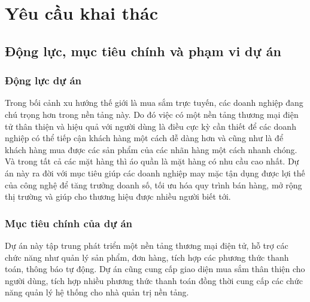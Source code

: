 \section{Yêu cầu khai thác}
    \subsection{Động lực, mục tiêu chính và phạm vi dự án}
        \subsubsection{Động lực dự án}
            Trong bối cảnh xu hướng thế giới là mua sắm trực tuyến, các doanh nghiệp đang chú trọng hơn trong nền tảng này. Do đó việc có một nền tảng thương mại điện tử thân thiện và hiệu quả với người dùng là điều cực kỳ cần thiết để các doanh nghiệp có thể tiếp cận khách hàng một cách dễ dàng hơn và cũng như là để khách hàng mua được các sản phẩm của các nhãn hàng một cách nhanh chóng. Và trong tất cả các mặt hàng thì áo quần là mặt hàng có nhu cầu cao nhất. Dự án này ra đời với mục tiêu giúp các doanh nghiệp may mặc tận dụng được lợi thế của công nghệ để tăng trưởng doanh số, tối ưu hóa quy trình bán hàng, mở rộng thị trường và giúp cho thương hiệu được nhiều người biết tới.\\
        \subsubsection{Mục tiêu chính của dự án}
            Dự án này tập trung phát triển một nền tảng thương mại điện tử, hỗ trợ các chức năng như quản lý sản phẩm, đơn hàng, tích hợp các phương thức thanh toán, thông báo tự động. Dự án cũng cung cấp giao diện mua sắm thân thiện cho người dùng, tích hợp nhiều phương thức thanh toán đồng thời cung cấp các chức năng quản lý hệ thống cho nhà quản trị nền tảng.\\
